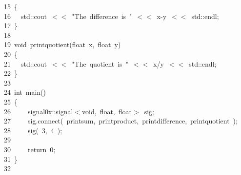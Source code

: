 \documentclass[9pt,onside,a4paper]{article}
\newcommand{\hlstd}[1]{\textcolor[rgb]{0.2,0,0.4}{#1}}
\newcommand{\hlnum}[1]{\textcolor[rgb]{0.2,0.73,0.02}{#1}}
\newcommand{\hlstr}[1]{\textcolor[rgb]{0.09,0.38,0.65}{#1}}
\newcommand{\hlopt}[1]{\textcolor[rgb]{0.33,0.33,0.33}{#1}}
\newcommand{\hllin}[1]{\textcolor[rgb]{0.6,0.6,0.6}{#1}}
\newcommand{\hlkwa}[1]{\textcolor[rgb]{1,0.19,0.19}{#1}}
\newcommand{\hlkwb}[1]{\textcolor[rgb]{0.96,0.55,0.14}{#1}}
\newcommand{\hlkwd}[1]{\textcolor[rgb]{0.82,0.11,0.93}{#1}}
\begin{document}
\hllin{\ \ \ 15\ }\hlstd{}\hlopt{\{}\\
\hllin{\ \ \ 16\ }\hlstd{}\hlstd{\ \ }\hlstd{std}\hlopt{::}\hlstd{cout\ }\hlopt{$<$$<$\ }\hlstd{}\hlstr{"The\ difference\ is\ "}\hlstd{\ }\hlopt{$<$$<$\ }\hlstd{x}\hlopt{{-}}\hlstd{y\ }\hlopt{$<$$<$\ }\hlstd{std}\hlopt{::}\hlstd{endl}\hlopt{;}\\
\hllin{\ \ \ 17\ }\hlstd{}\hlopt{\}}\\
\hllin{\ \ \ 18\ }\hlstd{}\\
\hllin{\ \ \ 19\ }\hlkwb{void\ }\hlstd{}\hlkwd{print\textunderscore quotient}\hlstd{}\hlopt{(}\hlstd{}\hlkwb{float\ }\hlstd{x}\hlopt{,\ }\hlstd{}\hlkwb{float\ }\hlstd{y}\hlopt{)}\\
\hllin{\ \ \ 20\ }\hlstd{}\hlopt{\{}\\
\hllin{\ \ \ 21\ }\hlstd{}\hlstd{\ \ }\hlstd{std}\hlopt{::}\hlstd{cout\ }\hlopt{$<$$<$\ }\hlstd{}\hlstr{"The\ quotient\ is\ "}\hlstd{\ }\hlopt{$<$$<$\ }\hlstd{x}\hlopt{/}\hlstd{y\ }\hlopt{$<$$<$\ }\hlstd{std}\hlopt{::}\hlstd{endl}\hlopt{;}\\
\hllin{\ \ \ 22\ }\hlstd{}\hlopt{\}}\\
\hllin{\ \ \ 23\ }\hlstd{}\\
\hllin{\ \ \ 24\ }\hlkwb{int\ }\hlstd{}\hlkwd{main}\hlstd{}\hlopt{()}\\
\hllin{\ \ \ 25\ }\hlstd{}\hlopt{\{}\\
\hllin{\ \ \ 26\ }\hlstd{}\hlstd{\ \ \ \ }\hlstd{signal0x}\hlopt{::}\hlstd{signal}\hlopt{$<$}\hlstd{}\hlkwb{void}\hlstd{}\hlopt{,\ }\hlstd{}\hlkwb{float}\hlstd{}\hlopt{,\ }\hlstd{}\hlkwb{float}\hlstd{}\hlopt{$>$\ }\hlstd{sig}\hlopt{;}\\
\hllin{\ \ \ 27\ }\hlstd{}\hlstd{\ \ \ \ }\hlstd{sig}\hlopt{.}\hlstd{}\hlkwd{connect}\hlstd{}\hlopt{(\ }\hlstd{print\textunderscore sum}\hlopt{,\ }\hlstd{print\textunderscore product}\hlopt{,\ }\hlstd{print\textunderscore difference}\hlopt{,\ }\hlstd{print\textunderscore quotient\ }\hlopt{);}\\
\hllin{\ \ \ 28\ }\hlstd{}\hlstd{\ \ \ \ }\hlstd{}\hlkwd{sig}\hlstd{}\hlopt{(\ }\hlstd{}\hlnum{3}\hlstd{}\hlopt{,\ }\hlstd{}\hlnum{4\ }\hlstd{}\hlopt{);\ }\\
\hllin{\ \ \ 29\ }\hlstd{\\
\hllin{\ \ \ 30\ }}\hlstd{\ \ \ \ }\hlstd{}\hlkwa{return\ }\hlstd{}\hlnum{0}\hlstd{}\hlopt{;}\\
\hllin{\ \ \ 31\ }\hlstd{}\hlopt{\}}\\
\hllin{\ \ \ 32\ }\hlstd{}\\
\mbox{}
\normalfont
\normalsize
\end{document}
